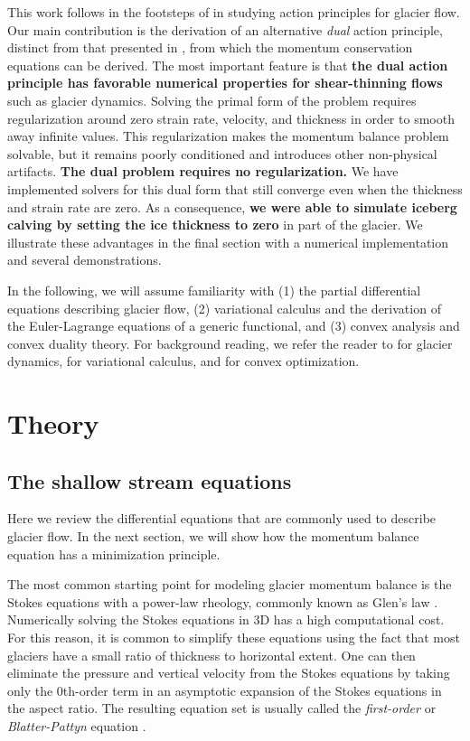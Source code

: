 \documentclass[twocolumn,letterpaper]{igs}
\begin{document}
This work follows in the footsteps of \citet{dukowicz2010consistent} in studying action principles for glacier flow.
Our main contribution is the derivation of an alternative \emph{dual} action principle, distinct from that presented in \citet{dukowicz2010consistent}, from which the momentum conservation equations can be derived.
The most important feature is that \textbf{the dual action principle has favorable numerical properties for shear-thinning flows} such as glacier dynamics.
Solving the primal form of the problem requires regularization around zero strain rate, velocity, and thickness in order to smooth away infinite values.
This regularization makes the momentum balance problem solvable, but it remains poorly conditioned and introduces other non-physical artifacts.
\textbf{The dual problem requires no regularization.}
We have implemented solvers for this dual form that still converge even when the thickness and strain rate are zero.
As a consequence, \textbf{we were able to simulate iceberg calving by setting the ice thickness to zero} in part of the glacier.
We illustrate these advantages in the final section with a numerical implementation and several demonstrations.

In the following, we will assume familiarity with (1) the partial differential equations describing glacier flow, (2) variational calculus and the derivation of the Euler-Lagrange equations of a generic functional, and (3) convex analysis and convex duality theory.
For background reading, we refer the reader to \citet{greve2009dynamics} for glacier dynamics, \citet{weinstock1974calculus} for variational calculus, and \citet{boyd2004convex} for convex optimization.



\section{Theory}

\subsection{The shallow stream equations}

Here we review the differential equations that are commonly used to describe glacier flow.
In the next section, we will show how the momentum balance equation has a minimization principle.

The most common starting point for modeling glacier momentum balance is the Stokes equations with a power-law rheology, commonly known as Glen's law \citep{glen1958law, greve2009dynamics}.
Numerically solving the Stokes equations in 3D has a high computational cost.
For this reason, it is common to simplify these equations using the fact that most glaciers have a small ratio of thickness to horizontal extent.
One can then eliminate the pressure and vertical velocity from the Stokes equations by taking only the 0th-order term in an asymptotic expansion of the Stokes equations in the aspect ratio.
The resulting equation set is usually called the \emph{first-order} or \emph{Blatter-Pattyn} equation \citep{greve2009dynamics}.
\end{document}
